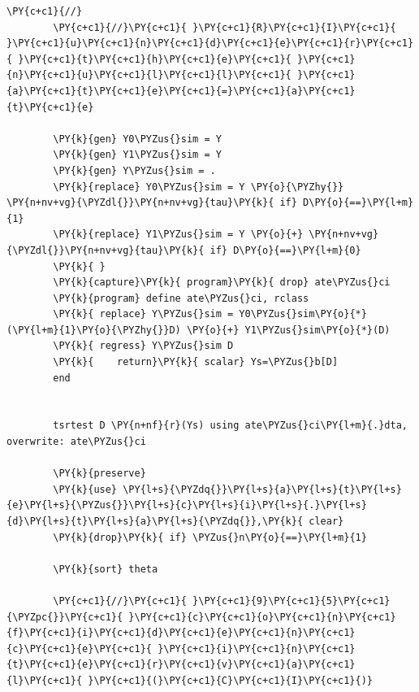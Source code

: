 \documentclass[11pt,notitlepage]{article}\usepackage[]{graphicx}\usepackage[]{color}
\makeatletter
\newenvironment{kframe}{%
 \def\at@end@of@kframe{}%
 \ifinner\ifhmode%
  \def\at@end@of@kframe{\end{minipage}}%
  \begin{minipage}{\columnwidth}%
 \fi\fi%
 \def\FrameCommand##1{\hskip\@totalleftmargin \hskip-\fboxsep
 \colorbox{shadecolor}{##1}\hskip-\fboxsep
     \hskip-\linewidth \hskip-\@totalleftmargin \hskip\columnwidth}%
 \MakeFramed {\advance\hsize-\width
   \@totalleftmargin\z@ \linewidth\hsize
   \@setminipage}}%
 {\par\unskip\endMakeFramed%
 \at@end@of@kframe}
\newenvironment{knitrout}{}{} %
\makeatother
\begin{document}
\begin{enumerate}[a)]
\begin{knitrout}
\begin{kframe}
\begin{Verbatim}[commandchars=\\\{\}]
        \PY{c+c1}{//}
        \PY{c+c1}{//}\PY{c+c1}{ }\PY{c+c1}{R}\PY{c+c1}{I}\PY{c+c1}{ }\PY{c+c1}{u}\PY{c+c1}{n}\PY{c+c1}{d}\PY{c+c1}{e}\PY{c+c1}{r}\PY{c+c1}{ }\PY{c+c1}{t}\PY{c+c1}{h}\PY{c+c1}{e}\PY{c+c1}{ }\PY{c+c1}{n}\PY{c+c1}{u}\PY{c+c1}{l}\PY{c+c1}{l}\PY{c+c1}{ }\PY{c+c1}{a}\PY{c+c1}{t}\PY{c+c1}{e}\PY{c+c1}{=}\PY{c+c1}{a}\PY{c+c1}{t}\PY{c+c1}{e}
        
        \PY{k}{gen} Y0\PYZus{}sim = Y
        \PY{k}{gen} Y1\PYZus{}sim = Y
        \PY{k}{gen} Y\PYZus{}sim = .
        \PY{k}{replace} Y0\PYZus{}sim = Y \PY{o}{\PYZhy{}} \PY{n+nv+vg}{\PYZdl{}}\PY{n+nv+vg}{tau}\PY{k}{ if} D\PY{o}{==}\PY{l+m}{1}
        \PY{k}{replace} Y1\PYZus{}sim = Y \PY{o}{+} \PY{n+nv+vg}{\PYZdl{}}\PY{n+nv+vg}{tau}\PY{k}{ if} D\PY{o}{==}\PY{l+m}{0}
        \PY{k}{	}
        \PY{k}{capture}\PY{k}{ program}\PY{k}{ drop} ate\PYZus{}ci
        \PY{k}{program} define ate\PYZus{}ci, rclass
        \PY{k}{	replace} Y\PYZus{}sim = Y0\PYZus{}sim\PY{o}{*}(\PY{l+m}{1}\PY{o}{\PYZhy{}}D) \PY{o}{+} Y1\PYZus{}sim\PY{o}{*}(D) 
        \PY{k}{	regress} Y\PYZus{}sim D 
        \PY{k}{    return}\PY{k}{ scalar} Ys=\PYZus{}b[D]	
        end
        
        
        tsrtest D \PY{n+nf}{r}(Ys) using ate\PYZus{}ci\PY{l+m}{.}dta, overwrite: ate\PYZus{}ci
        
        \PY{k}{preserve}
        \PY{k}{use} \PY{l+s}{\PYZdq{}}\PY{l+s}{a}\PY{l+s}{t}\PY{l+s}{e}\PY{l+s}{\PYZus{}}\PY{l+s}{c}\PY{l+s}{i}\PY{l+s}{.}\PY{l+s}{d}\PY{l+s}{t}\PY{l+s}{a}\PY{l+s}{\PYZdq{}},\PY{k}{ clear}
        \PY{k}{drop}\PY{k}{ if} \PYZus{}n\PY{o}{==}\PY{l+m}{1}
        
        \PY{k}{sort} theta
        
        \PY{c+c1}{//}\PY{c+c1}{ }\PY{c+c1}{9}\PY{c+c1}{5}\PY{c+c1}{\PYZpc{}}\PY{c+c1}{ }\PY{c+c1}{c}\PY{c+c1}{o}\PY{c+c1}{n}\PY{c+c1}{f}\PY{c+c1}{i}\PY{c+c1}{d}\PY{c+c1}{e}\PY{c+c1}{n}\PY{c+c1}{c}\PY{c+c1}{e}\PY{c+c1}{ }\PY{c+c1}{i}\PY{c+c1}{n}\PY{c+c1}{t}\PY{c+c1}{e}\PY{c+c1}{r}\PY{c+c1}{v}\PY{c+c1}{a}\PY{c+c1}{l}\PY{c+c1}{ }\PY{c+c1}{(}\PY{c+c1}{C}\PY{c+c1}{I}\PY{c+c1}{)}
        

\end{Verbatim}
\end{kframe}
\end{knitrout}
\end{enumerate}
\end{document}
